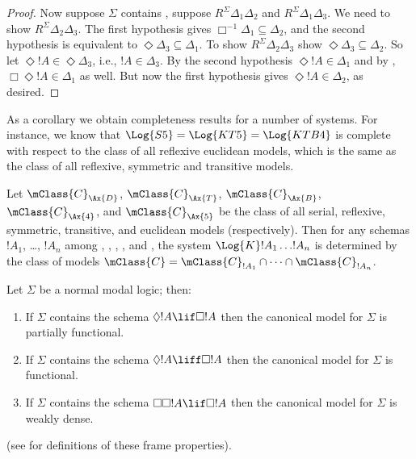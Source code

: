 \documentclass[../../../include/open-logic-section]{subfiles}
\begin{document}
\begin{proof}
  Now suppose $\Sigma$ contains , suppose $R^\Sigma
  \Delta_1\Delta_2$ and $R^\Sigma \Delta_1\Delta_3$. We need to show
  $R^\Sigma \Delta_2\Delta_3$. The first hypothesis gives
  $\Box^{-1}\Delta_1 \subseteq \Delta_2$, and the second hypothesis is
  equivalent to $\Diamond\Delta_3 \subseteq \Delta_1$.  To show $R^\Sigma
  \Delta_2\Delta_3$
  show $\Diamond\Delta_3 \subseteq \Delta_2$. So let $\Diamond!A \in
  \Diamond\Delta_3$, i.e., $!A \in \Delta_3$. By the second hypothesis
  $\Diamond!A \in \Delta_1$ and by , $\Box\Diamond!A \in
  \Delta_1$ as well. But now the first hypothesis gives $\Diamond!A \in
  \Delta_2$, as desired.
  \end{proof}

As a corollary we obtain completeness results for a number of
systems. For instance, we know that $\Log{S5} = \Log{KT5} =
\Log{KTB4}$ is complete with respect to the class of all reflexive
euclidean models, which is the same as the class of all reflexive,
symmetric and transitive models.

\begin{thm}
  Let $\mClass{C}_\Ax{D}$, $\mClass{C}_\Ax{T}$,
  $\mClass{C}_\Ax{B}$, $\mClass{C}_\Ax{4}$, and
  $\mClass{C}_\Ax{5}$ be the class of all serial, reflexive,
  symmetric, transitive, and euclidean models (respectively). Then for
  any schemas $!A_1$, \dots, $!A_n$ among ,
  , , , and , the system
  $\Log{K}!A_1 \dots !A_n$ is determined by the
  class of models $\mClass{C} = \mClass{C}_{!A_1} \cap \dots
  \cap \mClass{C}_{!A_n}$. 
\end{thm}

\begin{prop}
  Let $\Sigma$ be a normal modal logic; then:
  \begin{enumerate}
  \item{}%
    If $\Sigma$ contains the schema $\Diamond!A \lif \Box 
    !A$ then the canonical model for $\Sigma$ is partially functional. 
  \item If $\Sigma$ contains the schema $\Diamond!A \liff \Box 
    !A$ then the canonical model for $\Sigma$ is functional. 
  \item If $\Sigma$ contains the schema $\Box\Box!A \lif \Box 
    !A$ then the canonical model for $\Sigma$ is weakly dense. 
  \end{enumerate}
(see  for definitions of these frame
  properties).
\end{prop}
\end{document}
